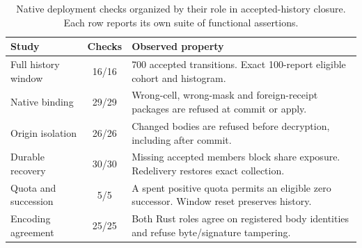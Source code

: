 \begin{table}[t]
\centering
\caption{Native deployment checks organized by their role in accepted-history closure. Each row reports its own suite of functional assertions.}
\label{tab:accepted-history-deployment}
\footnotesize
\setlength{\tabcolsep}{3pt}
\renewcommand{\arraystretch}{1.08}
\begin{tabularx}{\columnwidth}{@{}l c Y@{}}
\toprule
Study & Checks & Observed property \\
\midrule
Full history window & 16/16 & 700 accepted transitions. Exact 100-report eligible cohort and histogram. \\
Native binding & 29/29 & Wrong-cell, wrong-mask and foreign-receipt packages are refused at commit or apply. \\
Origin isolation & 26/26 & Changed bodies are refused before decryption, including after commit. \\
Durable recovery & 30/30 & Missing accepted members block share exposure. Redelivery restores exact collection. \\
Quota and succession & 5/5 & A spent positive quota permits an eligible zero successor. Window reset preserves history. \\
Encoding agreement & 25/25 & Both Rust roles agree on registered body identities and refuse byte/signature tampering. \\
\bottomrule
\end{tabularx}
\end{table}
